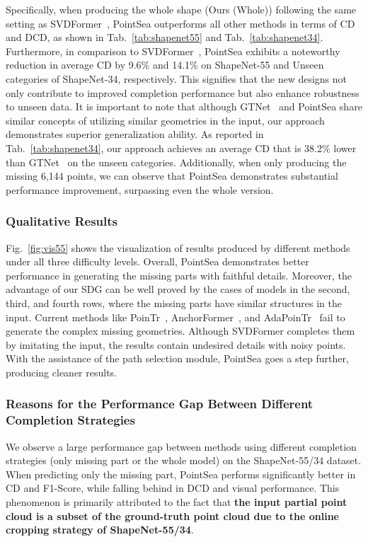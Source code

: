 Specifically, when producing the whole shape (Ours (Whole)) following the same setting as SVDFormer~\citep{Zhu_2023_ICCV}, PointSea outperforms all other methods in terms of CD and DCD, as shown in Tab.~\ref{tab:shapenet55} and Tab.~\ref{tab:shapenet34}. 
Furthermore, in comparison to SVDFormer~\citep{Zhu_2023_ICCV}, PointSea exhibits a noteworthy reduction in average CD by 9.6\% and 14.1\% on ShapeNet-55 and Unseen categories of ShapeNet-34, respectively. This signifies that the new designs not only contribute to improved completion performance but also enhance robustness to unseen data.
It is important to note that although GTNet~\citep{DBLP:journals/ijcv/ZhangLXNZTL23} and PointSea share similar concepts of utilizing similar geometries in the input, our approach demonstrates superior generalization ability. As reported in Tab.~\ref{tab:shapenet34}, our approach achieves an average CD that is 38.2\% lower than GTNet~\citep{DBLP:journals/ijcv/ZhangLXNZTL23} on the unseen categories.
Additionally, when only producing the missing 6,144 points, we can observe that PointSea demonstrates substantial performance improvement, surpassing even the whole version.

\subsubsection{Qualitative Results}
Fig.~\ref{fig:vis55} shows the visualization of results produced by different methods under all three difficulty levels. Overall, PointSea demonstrates better performance in generating the missing parts with faithful details.
Moreover, the advantage of our SDG can be well proved by the cases of models in the second, third, and fourth rows, where the missing parts have similar structures in the input. Current methods like PoinTr~\citep{yu2021pointr}, AnchorFormer~\citep{chen2023anchorformer}, and AdaPoinTr~\citep{10232862} fail to generate the complex missing geometries. Although SVDFormer completes them by imitating the input, the results contain undesired details with noisy points. With the assistance of the path selection module, PointSea goes a step further, producing cleaner results.


\subsubsection{Reasons for the Performance Gap Between Different Completion Strategies}
We observe a large performance gap between methods using different completion strategies (only missing part or the whole model) on the ShapeNet-55/34 dataset. When predicting only the missing part, PointSea performs significantly better in CD and F1-Score, while falling behind in DCD and visual performance. 
This phenomenon is primarily attributed to the fact that \textbf{the input partial point cloud is a subset of the ground-truth point cloud due to the online cropping strategy of ShapeNet-55/34}. 

